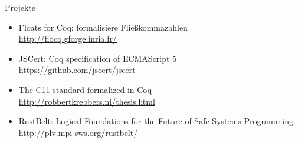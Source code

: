 \documentclass[aspectratio=169]{beamer}
\begin{document}
\begin{frame}
  \begin{center}
    \Large{Projekte}
  \end{center}
  \begin{itemize}
  \item Floats for Coq: formalisiere Fließkommazahlen\\
    \qquad \url{http://flocq.gforge.inria.fr/}
  \item JSCert: Coq specification of ECMAScript 5\\
    \qquad \url{https://github.com/jscert/jscert}
  \item The C11 standard formalized in Coq\\
    \qquad \url{http://robbertkrebbers.nl/thesis.html}
  \item RustBelt: Logical Foundations for the Future of Safe Systems Programming\\
    \qquad \url{http://plv.mpi-sws.org/rustbelt/}
  \end{itemize}
\end{frame}
\end{document}
